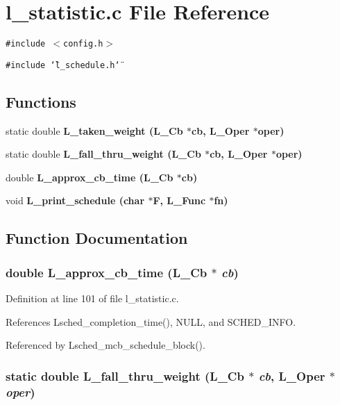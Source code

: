\section{l\_\-statistic.c File Reference}
\label{l__statistic_8c}
{\tt \#include $<$config.h$>$}\par
{\tt \#include \char`\"{}l\_\-schedule.h\char`\"{}}\par
\subsection*{Functions}
\begin{CompactItemize}
\item 
static double \bf{L\_\-taken\_\-weight} (L\_\-Cb $\ast$cb, L\_\-Oper $\ast$oper)
\item 
static double \bf{L\_\-fall\_\-thru\_\-weight} (L\_\-Cb $\ast$cb, L\_\-Oper $\ast$oper)
\item 
double \bf{L\_\-approx\_\-cb\_\-time} (L\_\-Cb $\ast$cb)
\item 
void \bf{L\_\-print\_\-schedule} (char $\ast$\bf{F}, L\_\-Func $\ast$fn)
\end{CompactItemize}


\subsection{Function Documentation}
\subsubsection{\setlength{\rightskip}{0pt plus 5cm}double L\_\-approx\_\-cb\_\-time (L\_\-Cb $\ast$ {\em cb})}\label{l__statistic_8c_a94cf304bcc32ebd982fa08332a51ae5}




Definition at line 101 of file l\_\-statistic.c.

References Lsched\_\-completion\_\-time(), NULL, and SCHED\_\-INFO.

Referenced by Lsched\_\-mcb\_\-schedule\_\-block().
\subsubsection{\setlength{\rightskip}{0pt plus 5cm}static double L\_\-fall\_\-thru\_\-weight (L\_\-Cb $\ast$ {\em cb}, L\_\-Oper $\ast$ {\em oper})\hspace{0.3cm}{\tt  [static]}}\label{l__statistic_8c_f94b2acd8c2d8ee41abe9f9a5a622aee}




